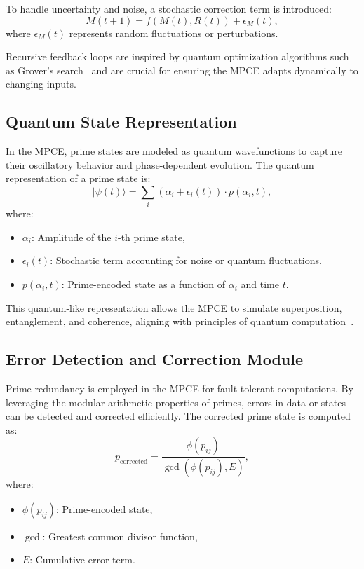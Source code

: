 \documentclass{article}
\theoremstyle{plain}
\begin{document}
To handle uncertainty and noise, a stochastic correction term is introduced:
\begin{equation}
    M(t+1) = f(M(t), R(t)) + \epsilon_M(t),
\end{equation}
where \( \epsilon_M(t) \) represents random fluctuations or perturbations.

Recursive feedback loops are inspired by quantum optimization algorithms such as Grover's search~\cite{grover1996fast} and are crucial for ensuring the MPCE adapts dynamically to changing inputs.

\subsection{Quantum State Representation}

In the MPCE, prime states are modeled as quantum wavefunctions to capture their oscillatory behavior and phase-dependent evolution. The quantum representation of a prime state is:
\begin{equation}
    |\psi(t)\rangle = \sum_{i} \left( \alpha_i + \epsilon_i(t) \right) \cdot p(\alpha_i, t),
\end{equation}
where:
\begin{itemize}
    \item \( \alpha_i \): Amplitude of the \( i \)-th prime state,
    \item \( \epsilon_i(t) \): Stochastic term accounting for noise or quantum fluctuations,
    \item \( p(\alpha_i, t) \): Prime-encoded state as a function of \( \alpha_i \) and time \( t \).
\end{itemize}

This quantum-like representation allows the MPCE to simulate superposition, entanglement, and coherence, aligning with principles of quantum computation~\cite{feynman2010quantum, deutsch1985quantum}.

\subsection{Error Detection and Correction Module}

Prime redundancy is employed in the MPCE for fault-tolerant computations. By leveraging the modular arithmetic properties of primes, errors in data or states can be detected and corrected efficiently. The corrected prime state is computed as:
\begin{equation}
    p_{\text{corrected}} = \frac{\phi(p_{ij})}{\gcd(\phi(p_{ij}), E)},
\end{equation}
where:
\begin{itemize}
    \item \( \phi(p_{ij}) \): Prime-encoded state,
    \item \( \gcd \): Greatest common divisor function,
    \item \( E \): Cumulative error term.
\end{itemize}
\end{document}
